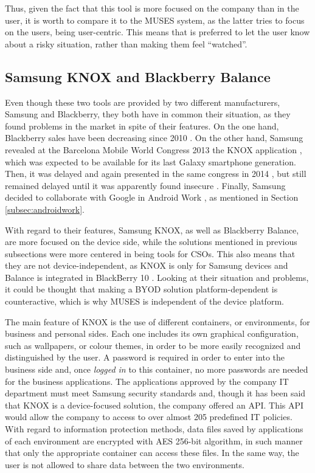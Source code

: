 Thus, given the fact that this tool is more focused on the company than in the user, it is worth to compare it to the MUSES system, as the latter tries to focus on the users, being user-centric. This means that is preferred to let the user know about a risky situation, rather than making them feel ``watched''. 


\subsection{Samsung KNOX and Blackberry Balance}
\label{subsec:samsungblackberry}

Even though these two tools are provided by two different manufacturers, Samsung and Blackberry, they both have in common their situation, as they found problems in the market in spite of their features. On the one hand, Blackberry sales have been decreasing since 2010 \cite{Blackberry_sales}.
On the other hand, Samsung revealed at the Barcelona Mobile World Congress 2013 the KNOX application \cite{Samsung_mwc13}, which was expected to be available for its last Galaxy smartphone generation. Then, it was delayed and again presented in the same congress in 2014 \cite{Samsung_mwc14}, but still remained delayed until it was apparently found insecure \cite{Samsung_insecure}. Finally, Samsung decided to collaborate with Google in Android Work \cite{Samsung_android}, as mentioned in Section \ref{subsec:androidwork}.

With regard to their features, Samsung KNOX, as well as Blackberry Balance, are more focused on the device side, while the solutions mentioned in previous subsections were more centered in being tools for CSOs. This also means that they are not device-independent, as KNOX is only for Samsung devices and Balance is integrated in BlackBerry 10 \cite{Blackberry_tool}. Looking at their situation and problems, it could be thought that making a BYOD solution platform-dependent is counteractive, which is why MUSES is independent of the device platform.

The main feature of KNOX is the use of different containers, or environments, for business and personal sides. Each one includes its own graphical configuration, such as wallpapers, or colour themes, in order to be more easily recognized and distinguished by the user.
A password is required in order to enter into the business side and, once \textit{logged in} to this container, no more passwords are needed for the business applications. The applications approved by the company IT department must meet Samsung security standards and, though it has been said that KNOX is a device-focused solution, the company offered an API. This API would allow the company to access to over almost 205 predefined IT policies. With regard to information protection methods, data files saved by applications of each environment are encrypted with AES 256-bit algorithm, in such manner that only the appropriate container can access these files. In the same way, the user is not allowed to share data between the two environments. 

